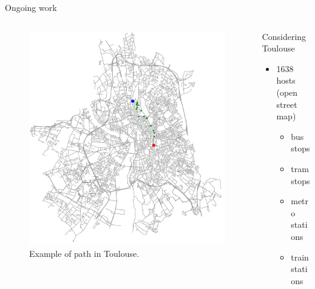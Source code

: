 \documentclass[Ligatures=TeX,table,svgnames,usetotalslideindicator,compress,10pt,aspectratio=169]{beamer}
\begin{document}
\begin{frame}{Ongoing work}



\begin{columns}

\begin{column}{0.5\textwidth}

   \begin{figure}[!h]
        \centering
        \includegraphics[width=.94\textwidth]{images/toulouse_path.png}
        \caption{Example of path in Toulouse.}
      \end{figure}
      \end{column}
\begin{column}{0.5\textwidth}
Considering Toulouse
\begin{itemize}
    \item 1638 hosts (open street map)
    \begin{itemize}
        \item bus stops
        \item tram stops
        \item metro stations
        \item train stations
    \end{itemize}
\end{itemize}
\end{column}
\end{columns}

\end{frame}
\end{document}
